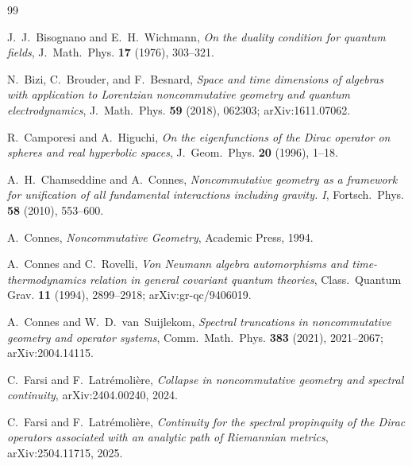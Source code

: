 \documentclass[11pt,a4paper]{article}
\theoremstyle{plain}
\theoremstyle{definition}
\begin{document}

\begin{thebibliography}{99}

J.~J.~Bisognano and E.~H.~Wichmann,
\newblock \emph{On the duality condition for quantum fields},
\newblock J.~Math.~Phys. \textbf{17} (1976), 303--321.

N.~Bizi, C.~Brouder, and F.~Besnard,
\newblock \emph{Space and time dimensions of algebras with
application to Lorentzian noncommutative geometry and quantum
electrodynamics},
\newblock J.~Math.~Phys. \textbf{59} (2018), 062303;
\newblock arXiv:1611.07062.

R.~Camporesi and A.~Higuchi,
\newblock \emph{On the eigenfunctions of the Dirac operator on
spheres and real hyperbolic spaces},
\newblock J.~Geom.~Phys. \textbf{20} (1996), 1--18.

A.~H.~Chamseddine and A.~Connes,
\newblock \emph{Noncommutative geometry as a framework for
unification of all fundamental interactions including gravity. I},
\newblock Fortsch.~Phys. \textbf{58} (2010), 553--600.

A.~Connes,
\newblock \emph{Noncommutative Geometry},
\newblock Academic Press, 1994.

A.~Connes and C.~Rovelli,
\newblock \emph{Von Neumann algebra automorphisms and
time-thermodynamics relation in general covariant quantum theories},
\newblock Class.~Quantum Grav. \textbf{11} (1994), 2899--2918;
\newblock arXiv:gr-qc/9406019.

A.~Connes and W.~D.~van~Suijlekom,
\newblock \emph{Spectral truncations in noncommutative geometry and
operator systems},
\newblock Comm.~Math.~Phys. \textbf{383} (2021), 2021--2067;
\newblock arXiv:2004.14115.

C.~Farsi and F.~Latr\'emoli\`ere,
\newblock \emph{Collapse in noncommutative geometry and spectral
continuity},
\newblock arXiv:2404.00240, 2024.

C.~Farsi and F.~Latr\'emoli\`ere,
\newblock \emph{Continuity for the spectral propinquity of the
Dirac operators associated with an analytic path of Riemannian
metrics},
\newblock arXiv:2504.11715, 2025.


\end{thebibliography}
\end{document}
